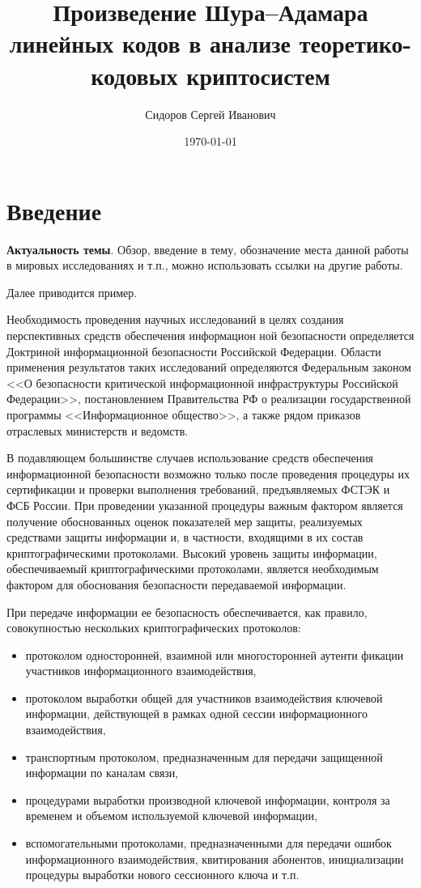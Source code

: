 \documentclass[12pt]{extreport}
\author{Сидоров Сергей Иванович}
\date{\today}
\title{Произведение Шура--Адамара линейных кодов в анализе теоретико-кодовых криптосистем}
\begin{document}
\maketitle
\tableofcontents

\chapter*{Введение}
\label{sec:org3b1da3a}

\textbf{Актуальность темы}.
Обзор, введение в тему, обозначение места данной работы в мировых исследованиях и т.п., можно использовать ссылки на другие
работы.

Далее приводится пример.

Необходимость проведения научных исследований в целях создания перспективных средств обеспечения информацион ной безопасности определяется Доктриной информационной безопасности Российской Федерации.
Области применения результатов таких исследований определяются Федеральным законом {}<<О безопасности критической информационной инфраструктуры Российской Федерации>>{}, постановлением Правительства РФ о реализации государственной программы {}<<Информационное общество>>{}, а также рядом приказов отраслевых министерств и ведомств.

В подавляющем большинстве случаев использование средств обеспечения информационной безопасности возможно только после проведения процедуры их сертификации и проверки выполнения требований, предъявляемых ФСТЭК и ФСБ России.
При проведении указанной процедуры важным фактором является получение обоснованных оценок показателей мер защиты, реализуемых средствами защиты информации и, в частности, входящими в их состав криптографическими протоколами.
Высокий уровень защиты информации, обеспечиваемый криптографическими протоколами, является необходимым фактором для обоснования безопасности передаваемой информации.

При передаче информации ее безопасность обеспечивается, как правило, совокупностью нескольких криптографических протоколов:
\begin{itemize}
\item протоколом односторонней, взаимной или многосторонней аутенти фикации участников информационного взаимодействия,
\item протоколом выработки общей для участников взаимодействия ключевой информации, действующей в рамках одной сессии информационного взаимодействия,
\item транспортным протоколом, предназначенным для передачи защищенной информации по каналам связи,
\item процедурами выработки производной ключевой информации, контроля за временем и объемом используемой ключевой информации,
\item вспомогательными протоколами, предназначенными для передачи ошибок информационного взаимодействия, квитирования абонентов, инициализации процедуры выработки нового сессионного ключа и т.п.
\end{itemize}
\end{document}
